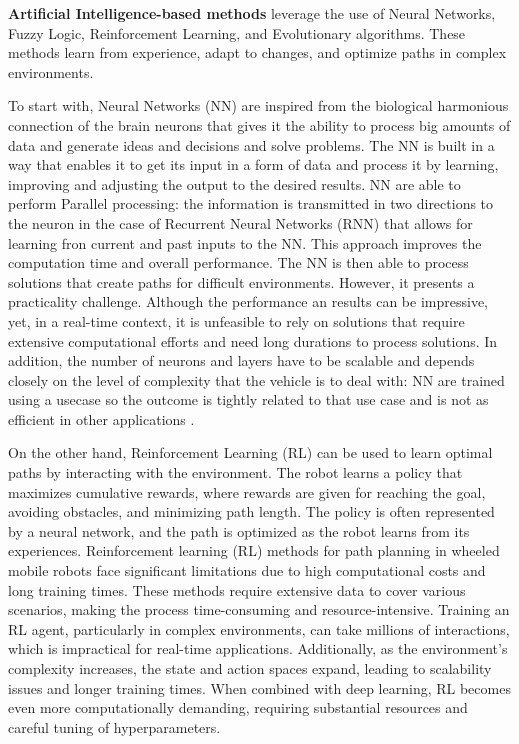 \textbf{Artificial Intelligence-based methods} 
leverage the use of Neural Networks, Fuzzy Logic, Reinforcement Learning, and Evolutionary algorithms. 
These methods learn from experience, adapt to changes, and optimize paths in complex environments. 


To start with, Neural Networks (NN) are inspired from the biological harmonious connection of the brain neurons
that gives it the ability to process big amounts of data and generate ideas and decisions and solve problems. 
The NN is built in a way that enables it to get its input in a form of data and process it by learning, improving 
and adjusting the output to the desired results. NN are able to perform Parallel processing: the information is 
transmitted in two
directions to the neuron in the case of Recurrent Neural Networks (RNN) that allows for learning fron current and 
past inputs to the NN. This approach improves the computation time and overall performance. 
The NN is then able to process solutions that create paths for difficult environments. 
However, it presents a practicality challenge. Although the performance an results can be impressive, yet, in a 
real-time context, 
it is unfeasible to rely on solutions that require extensive computational efforts and need long durations to 
process solutions. In addition, the number of neurons and layers have to be scalable and depends closely on the 
level of complexity that the vehicle is to deal with: NN are trained using a usecase so the 
outcome is tightly related to that use case and is not as efficient in other applications \cite{R12}. 

On the other hand, Reinforcement Learning (RL) can be used to learn optimal paths by interacting with the environment. 
The robot learns a policy that maximizes cumulative rewards, where rewards are given for reaching the goal, avoiding 
obstacles, and minimizing path length. The policy is often represented by a neural network, and the path is optimized 
as the robot learns from its experiences. Reinforcement learning (RL) methods for path planning in wheeled mobile robots 
face significant limitations due to high computational costs and long training times. These methods require extensive 
data to cover various scenarios, making the process time-consuming and resource-intensive. Training an RL agent, 
particularly in complex environments, can take millions of interactions, which is impractical for real-time applications. 
Additionally, as the environment's complexity increases, the state and action spaces expand, 
leading to scalability issues and longer training times. When combined with deep learning, RL becomes even more 
computationally demanding, requiring substantial resources and careful tuning of hyperparameters.

